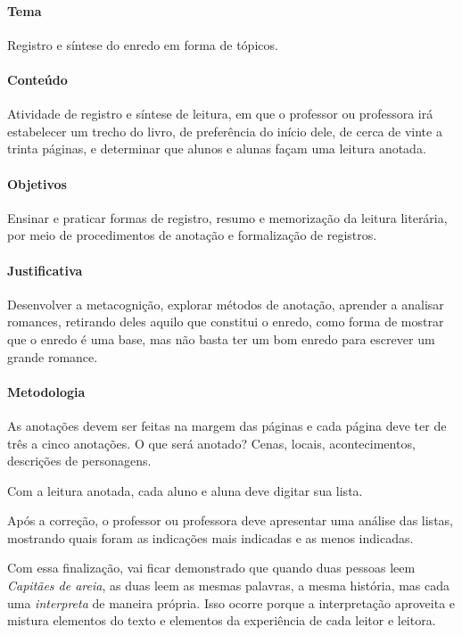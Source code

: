 \documentclass{article}
\begin{document}
\paragraph{Tema} Registro e síntese do enredo em forma de tópicos.

\paragraph{Conteúdo} Atividade de registro e síntese de leitura, em que
o professor ou professora irá estabelecer um trecho do
livro, de preferência do início dele, de cerca de vinte a trinta
páginas, e determinar que alunos e alunas façam uma leitura anotada.


\paragraph{Objetivos}
Ensinar e praticar formas de registro, resumo e memorização da leitura
literária, por meio de procedimentos de anotação e formalização de
registros.

\paragraph{Justificativa}
Desenvolver a metacognição, explorar métodos de anotação, aprender a
analisar romances, retirando deles aquilo que constitui o enredo, como
forma de mostrar que o enredo é uma base, mas não basta ter um bom
enredo para escrever um grande romance.

\paragraph{Metodologia}
As anotações devem ser feitas na margem das páginas e cada página deve
ter de três a cinco anotações. O que será anotado? Cenas, locais,
acontecimentos, descrições de personagens.

Com a leitura anotada, cada aluno e aluna deve digitar sua lista.

Após a correção, o professor ou professora deve apresentar uma análise
das listas, mostrando quais foram as indicações mais indicadas e as
menos indicadas.

Com essa finalização, vai ficar demonstrado que quando duas pessoas leem
\emph{Capitães de areia}, as duas leem as mesmas palavras, a mesma
história, mas cada uma \emph{interpreta} de maneira própria. Isso ocorre
porque a interpretação aproveita e mistura elementos do texto e
elementos da experiência de cada leitor e leitora.
\end{document}
